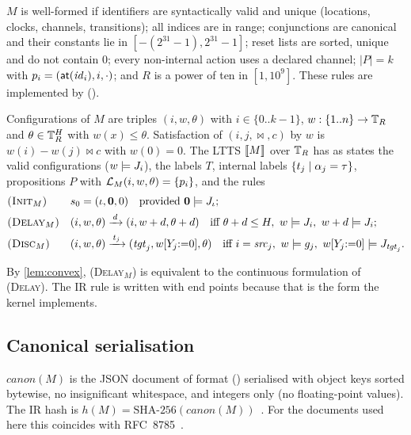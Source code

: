 \begin{definition}\label{def:wf-ir}
$M$ is well-formed if identifiers are syntactically valid and unique
(locations, clocks, channels, transitions); all indices are in range;
conjunctions are canonical and their constants lie in $[-(2^{31}-1),2^{31}-1]$;
reset lists are sorted, unique and do not contain $0$; every non-internal action
uses a declared channel; $|P|=k$ with $p_i=(\mathsf{at}(\mathit{id}_i),i,\cdot)$; and $R$ is
a power of ten in $[1,10^9]$. These rules are implemented by
 ().
\end{definition}

\begin{definition}\label{def:ir-sem}
Configurations of $M$ are triples $(i,w,\theta)$ with $i\in\{0..k-1\}$,
$w:\{1..n\}\to\mathbb{T}_R$ and $\theta\in\mathbb{T}_R^{H}$ with $w(x)\le\theta$. Satisfaction of
$(i,j,\bowtie,c)$ by $w$ is $w(i)-w(j)\bowtie c$ with $w(0)=0$. The LTTS $\llbracket M \rrbracket$ over
$\mathbb{T}_R$ has as states the valid configurations ($w\models J_i$), the labels $T$, internal
labels $\{t_j\mid\alpha_j=\tau\}$, propositions $P$ with
$\mathcal{L}_M(i,w,\theta)=\{p_i\}$, and the rules
\begin{align*}
&\textsc{(Init$_M$)} && s_0=(\iota,\mathbf{0},0)\quad\text{provided }\mathbf{0}\models J_\iota;\\
&\textsc{(Delay$_M$)} && (i,w,\theta)\xrightarrow{\,d\,}(i,w+d,\theta+d)
  \quad\text{iff } \theta+d\le H,\ w\models J_i,\ w+d\models J_i;\\
&\textsc{(Disc$_M$)} && (i,w,\theta)\xrightarrow{\,t_j\,}(\mathit{tgt}_j,w[Y_j{:=}0],\theta)
  \quad\text{iff } i=\mathit{src}_j,\ w\models g_j,\ w[Y_j{:=}0]\models J_{\mathit{tgt}_j}.
\end{align*}
\end{definition}

By \cref{lem:convex}, \textsc{(Delay$_M$)} is equivalent to the continuous
formulation of \textsc{(Delay)}. The IR rule is written with end points because
that is the form the kernel implements.

\subsection{Canonical serialisation}

\begin{definition}\label{def:canon}
$\mathit{canon}(M)$ is the JSON document of format 
() serialised with object keys sorted bytewise,
no insignificant whitespace, and integers only (no floating-point values). The
IR hash is $h(M)=\mathrm{SHA\text{-}256}(\mathit{canon}(M))$~\cite{fips}. For the
documents used here this coincides with RFC~8785~\cite{jcs}.
\end{definition}

